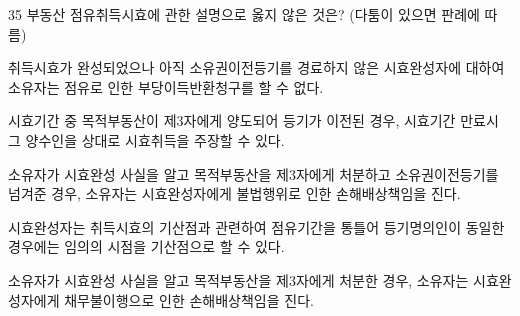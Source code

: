 \begin{question}{35}
부동산 점유취득시효에 관한 설명으로 옳지 않은 것은? (다툼이 있으면 판례에 따름)
\begin{choices}
  \item 취득시효가 완성되었으나 아직 소유권이전등기를 경료하지 않은 시효완성자에 대하여 소유자는 점유로 인한 부당이득반환청구를 할 수 없다.
  \item 시효기간 중 목적부동산이 제3자에게 양도되어 등기가 이전된 경우, 시효기간 만료시 그 양수인을 상대로 시효취득을 주장할 수 있다.
  \item 소유자가 시효완성 사실을 알고 목적부동산을 제3자에게 처분하고 소유권이전등기를 넘겨준 경우, 소유자는 시효완성자에게 불법행위로 인한 손해배상책임을 진다.
  \item 시효완성자는 취득시효의 기산점과 관련하여 점유기간을 통틀어 등기명의인이 동일한 경우에는 임의의 시점을 기산점으로 할 수 있다.
  \item 소유자가 시효완성 사실을 알고 목적부동산을 제3자에게 처분한 경우, 소유자는 시효완성자에게 채무불이행으로 인한 손해배상책임을 진다.
\end{choices}
\end{question}
